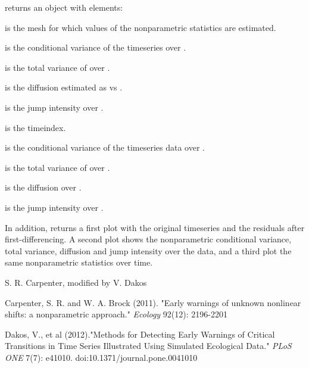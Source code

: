 \documentclass[a4paper]{book}
\begin{document}
\begin{Value}
 returns an object with elements:

\begin{ldescription}
\item[\code{avec}] is the mesh for which values of the
nonparametric statistics are estimated.

\item[\code{S2.vec}] is the conditional variance of the
timeseries  over .

\item[\code{TotVar.dx.vec}] is the total variance of 
over .

\item[\code{Diff2.vec}] is the diffusion estimated as
 vs
.

\item[\code{LamdaZ.vec}] is the jump intensity over
.

\item[\code{Tvec1}] is the timeindex.

\item[\code{S2.t}] is the conditional variance of the timeseries
 data over .

\item[\code{TotVar.t}] is the total variance of  over
.

\item[\code{Diff2.t}] is the diffusion over .

\item[\code{Lamda.t}] is the jump intensity over .

\end{ldescription}
In addition,  returns a first plot
with the original timeseries and the residuals after
first-differencing. A second plot shows the nonparametric
conditional variance, total variance, diffusion and jump
intensity over the data, and a third plot the same
nonparametric statistics over time.
\end{Value}
%
\begin{Author}\relax
S. R. Carpenter, modified by V. Dakos
\end{Author}
%
\begin{References}\relax
Carpenter, S. R. and W. A. Brock (2011). "Early warnings
of unknown nonlinear shifts: a nonparametric approach."
\emph{Ecology} 92(12): 2196-2201

Dakos, V., et al (2012)."Methods for Detecting Early
Warnings of Critical Transitions in Time Series
Illustrated Using Simulated Ecological Data." \emph{PLoS
ONE} 7(7): e41010. doi:10.1371/journal.pone.0041010
\end{References}
\end{document}
